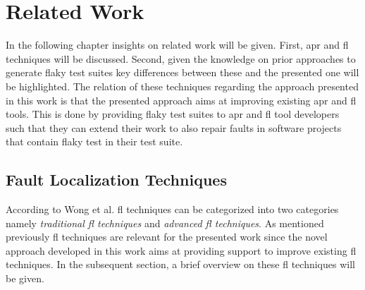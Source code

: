 \documentclass[
fancyheadings, %
%
%
]{stsreprt}
\begin{document}
\chapter{Related Work}\label{ch:rel_work}
In the following chapter insights on related work will be given. 
First, \acrlong{apr} and \acrlong{fl} techniques will be discussed. 
Second,  given the knowledge on prior approaches to generate flaky test suites key differences between these and the presented one will be highlighted. 
The relation of these techniques regarding the approach presented in this work is that the presented approach aims at improving existing \acrshort{apr} and \acrshort{fl} tools. 
This is done by providing flaky test suites to \acrshort{apr} and \acrshort{fl} tool developers such that they can extend their work to also repair faults in software projects that contain flaky test in their test suite. 

\section{Fault Localization Techniques}
According to Wong et al. \cite{fault-loc-survey:2016} \acrshort{fl} techniques can be categorized into two categories namely \textit{traditional \acrshort{fl} techniques} and \textit{advanced \acrshort{fl} techniques}. 
As mentioned previously \acrshort{fl} techniques are relevant for the presented work since the novel approach developed in this work aims at providing support to improve existing \acrshort{fl} techniques. 
In the subsequent section, a brief overview on these \acrshort{fl} techniques will be given. 
\end{document}
